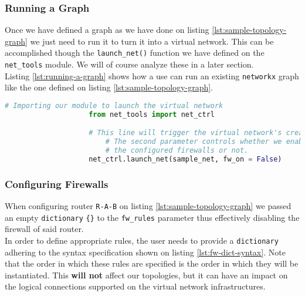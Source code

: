             \subsubsection{Running a Graph} \label{sec:graph-exec}
                Once we have defined a graph as we have done on listing \ref{lst:sample-topology-graph} we just need to run it to turn it into a virtual network. This can be accomplished though the \texttt{launch\_net()} function we have defined on the \texttt{net\_tools} module. We will of course analyze these in a later section.\\

                Listing \ref{lst:running-a-graph} shows how a use can run an existing \texttt{networkx} graph like the one defined on listing \ref{lst:sample-topology-graph}.\\

                \begin{lstlisting}[language = python, caption = Turning a graph into a virtual network., label = lst:running-a-graph]
                    # Importing our module to launch the virtual network
                    from net_tools import net_ctrl

                    # This line will trigger the virtual network's creation.
                        # The second parameter controls whether we enable
                        # the configured firewalls or not.
                    net_ctrl.launch_net(sample_net, fw_on = False)
                \end{lstlisting}

            \subsubsection{Configuring Firewalls} \label{sec:fw-rules}
                When configuring router \texttt{R-A-B} on listing \ref{lst:sample-topology-graph} we passed an empty \texttt{dictionary} \texttt{\{\}} to the \texttt{fw\_rules} parameter thus effectively disabling the firewall of said router.\\

                In order to define appropriate rules, the user needs to provide a \texttt{dictionary} adhering to the syntax specification shown on listing \ref{lst:fw-dict-syntax}. Note that the order in which these rules are specified is the order in which they will be instantiated. This \textbf{will not} affect our topologies, but it can have an impact on the logical connections supported on the virtual network infrastructures.\\

